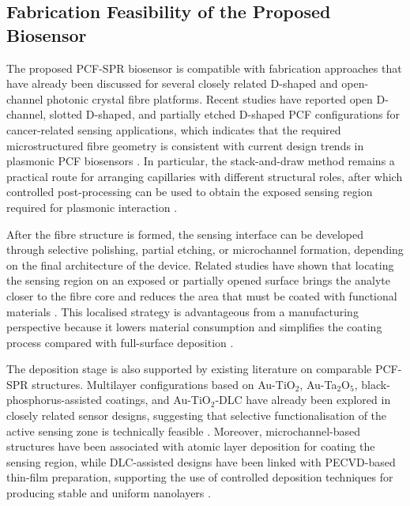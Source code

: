 \documentclass[preprint,12pt]{elsarticle}
\begin{document}
\subsection{\textbf{{Fabrication Feasibility of the Proposed Biosensor}}}

The proposed PCF-SPR biosensor is compatible with fabrication approaches that have already been discussed for several closely related D-shaped and open-channel photonic crystal fibre platforms. Recent studies have reported open D-channel, slotted D-shaped, and partially etched D-shaped PCF configurations for cancer-related sensing applications, which indicates that the required microstructured fibre geometry is consistent with current design trends in plasmonic PCF biosensors \cite{ashrafian2025highly,bhuyan2025black,singh2023bottom}. In particular, the stack-and-draw method remains a practical route for arranging capillaries with different structural roles, after which controlled post-processing can be used to obtain the exposed sensing region required for plasmonic interaction \cite{ashrafian2025highly}.

After the fibre structure is formed, the sensing interface can be developed through selective polishing, partial etching, or microchannel formation, depending on the final architecture of the device. Related studies have shown that locating the sensing region on an exposed or partially opened surface brings the analyte closer to the fibre core and reduces the area that must be coated with functional materials \cite{ashrafian2025highly,singh2023bottom,rafi2025cancer}. This localised strategy is advantageous from a manufacturing perspective because it lowers material consumption and simplifies the coating process compared with full-surface deposition \cite{ashrafian2025highly,rafi2025cancer}.

The deposition stage is also supported by existing literature on comparable PCF-SPR structures. Multilayer configurations based on Au-TiO$_2$, Au-Ta$_2$O$_5$, black-phosphorus-assisted coatings, and Au-TiO$_2$-DLC have already been explored in closely related sensor designs, suggesting that selective functionalisation of the active sensing zone is technically feasible \cite{rafi2025cancer,bhuyan2025black,erdogan2025diamond}. Moreover, microchannel-based structures have been associated with atomic layer deposition for coating the sensing region, while DLC-assisted designs have been linked with PECVD-based thin-film preparation, supporting the use of controlled deposition techniques for producing stable and uniform nanolayers \cite{ashrafian2025highly,erdogan2025diamond}.
\end{document}
